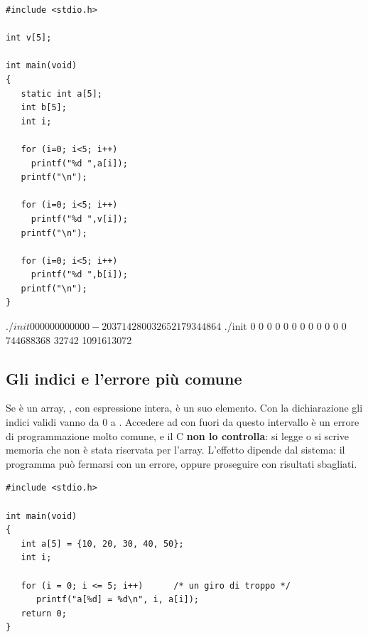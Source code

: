 \begin{affianco}[0.5][c]
\begin{lstlisting}[style=c, name=init.c]
#include <stdio.h>

int v[5];

int main(void)
{
   static int a[5];
   int b[5];
   int i;

   for (i=0; i<5; i++)
     printf("%d ",a[i]);
   printf("\n");

   for (i=0; i<5; i++)
     printf("%d ",v[i]);
   printf("\n");

   for (i=0; i<5; i++)
     printf("%d ",b[i]);
   printf("\n");
}
\end{lstlisting}
\risultato
\begin{console}
$ ./init
0 0 0 0 0
0 0 0 0 0
0 0 -2037142800 32652 179344864
$ ./init
0 0 0 0 0
0 0 0 0 0
0 0 744688368 32742 1091613072
\end{console}
\end{affianco}

\subsection{Gli indici e l'errore più comune}

Se  è un array, , con  espressione intera,
è un suo elemento. Con la dichiarazione  gli indici validi
vanno da 0 a . Accedere ad  con  fuori da
questo intervallo è un errore di programmazione molto comune, e il C
\textbf{non lo controlla}: si legge o si scrive memoria che non è stata
riservata per l'array. L'effetto dipende dal sistema: il programma può
fermarsi con un errore, oppure proseguire con risultati sbagliati.

\begin{affianco}[0.5][c]
\begin{lstlisting}[style=c, name=fuori.c]
#include <stdio.h>

int main(void)
{
   int a[5] = {10, 20, 30, 40, 50};
   int i;

   for (i = 0; i <= 5; i++)      /* un giro di troppo */
      printf("a[%d] = %d\n", i, a[i]);
   return 0;
}
\end{lstlisting}
\risultato
{}
\end{affianco}

